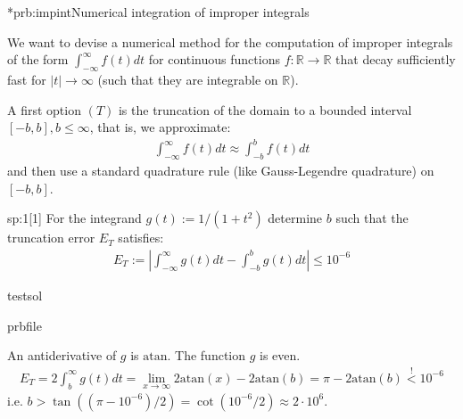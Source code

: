 
\begin{samproblem}*{prb:impint}{Numerical integration of improper integrals}{
  We want to devise a numerical method for the computation of improper integrals of the form 
  $\int_{-\infty}^{\infty} f(t) dt$ for continuous functions $f: \mathbb{R} \rightarrow \mathbb{R}$ 
  that decay sufficiently fast for $\lvert t \rvert \rightarrow \infty$ 
  (such that they are integrable on $\mathbb{R}$). 
 
  A first option $(T)$ is the truncation of the domain to a bounded interval $[-b,b], b \leq \infty$, that is, we approximate:
  \begin{align*}
    \int_{-\infty}^{\infty} f(t) dt \approx \int_{-b}^{b} f(t) dt
  \end{align*}
  and then use a standard quadrature rule (like Gauss-Legendre quadrature) on $[-b,b]$.
}
 
\begin{subproblem}{sp:1}[1]
  For the integrand $g(t) := 1 / (1 + t^2)$ determine $b$ such that the truncation error $E_T$ satisfies:
  \begin{align}
    E_T := \left\lvert  \int_{-\infty}^{\infty} g(t) dt - \int_{-b}^{b} g(t) dt \right \rvert \leq 10^{-6}
  \end{align}

  \begin{samwriteprbpart}{testsol}
    \begin{writeverbatim}{prbfile}
      \begin{samsolution}
        An antiderivative of $g$ is $\mathrm{atan}$. The function $g$ is even.
        \begin{align}
          E_T = 2 \int_b^\infty g(t) dt = \lim_{x \rightarrow \infty} 2 \mathrm{atan}(x) - 2 \mathrm{atan}(b) = \pi - 2 \mathrm{atan}(b) \overset{!}{<} 10^{-6}
        \end{align}
        i.e. $b > \tan((\pi -10^{-6}) / 2) = \cot(10^{-6} / 2) \approx 2 \cdot 10^6$.
      \end{samsolution}
    \end{writeverbatim}
  \end{samwriteprbpart}

\end{subproblem}
 

\end{samproblem}
